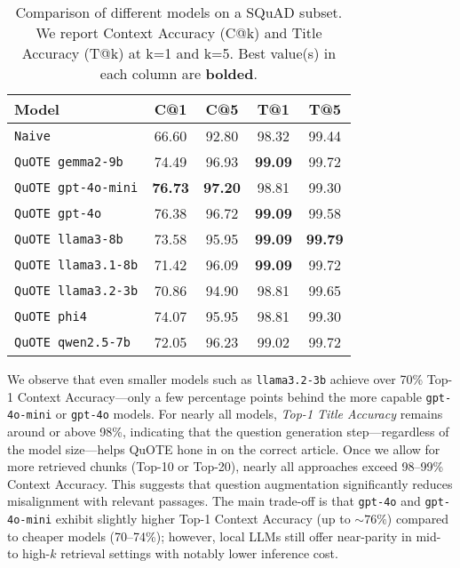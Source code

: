 \begin{table}[t]
\centering
\caption{Comparison of different models on a SQuAD subset. We report Context Accuracy (C@k) and Title Accuracy (T@k) at k=1 and k=5. Best value(s) in each column are \textbf{bolded}.}
\label{tab:cheaper-models}
\renewcommand{\arraystretch}{1.1}
\begin{tabular}{l|cc|cc}
\toprule
\textbf{Model} & \textbf{C@1} & \textbf{C@5} & \textbf{T@1} & \textbf{T@5} \\
\midrule
\texttt{Naive}       
& 66.60 & 92.80 & 98.32 & 99.44 \\
\midrule
\texttt{QuOTE gemma2-9b}   
& 74.49 & 96.93 & \textbf{99.09} & 99.72 \\
\texttt{QuOTE gpt-4o-mini} 
& \textbf{76.73} & \textbf{97.20} & 98.81 & 99.30 \\
\texttt{QuOTE gpt-4o}      
& 76.38 & 96.72 & \textbf{99.09} & 99.58 \\
\texttt{QuOTE llama3-8b}   
& 73.58 & 95.95 & \textbf{99.09} & \textbf{99.79} \\
\texttt{QuOTE llama3.1-8b} 
& 71.42 & 96.09 & \textbf{99.09} & 99.72 \\
\texttt{QuOTE llama3.2-3b} 
& 70.86 & 94.90 & 98.81 & 99.65 \\
\texttt{QuOTE phi4} 
& 74.07 & 95.95 & 98.81 & 99.30 \\
\texttt{QuOTE qwen2.5-7b}  
& 72.05 & 96.23 & 99.02 & 99.72 \\
\bottomrule
\end{tabular}
\end{table}

We observe that even
smaller models such as 
    \texttt{llama3.2-3b} achieve over 70\% Top-1 Context Accuracy---only a few percentage points behind the more capable 
    \texttt{gpt-4o-mini} or \texttt{gpt-4o} models.
For nearly all models, \emph{Top-1 Title Accuracy} remains around 
    or above 98\%, indicating that the question generation step—regardless of the model size—helps QuOTE 
hone in on the correct article.
Once we allow for more retrieved chunks 
    (Top-10 or Top-20), nearly all approaches exceed 98--99\% Context Accuracy. This suggests that 
    question augmentation significantly reduces misalignment with relevant passages.
    The main trade-off is that \texttt{gpt-4o} and \texttt{gpt-4o-mini} 
    exhibit slightly higher Top-1 Context Accuracy (up to $\sim76\%$) compared to cheaper models 
    (70--74\%); however, local LLMs still offer near-parity in mid- to high-$k$ retrieval settings 
    with notably lower inference cost.



